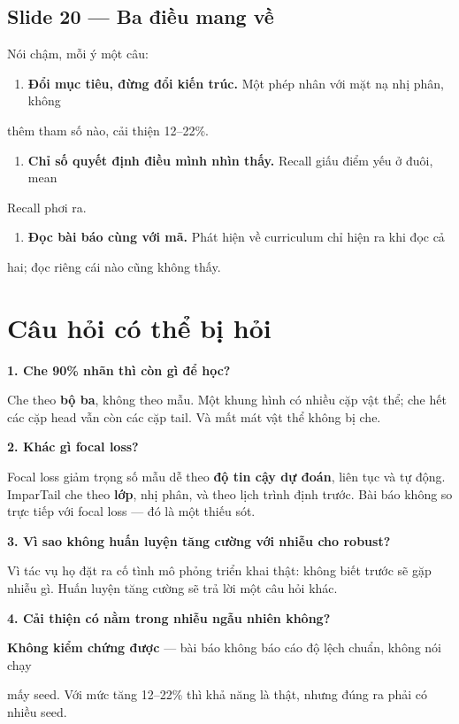 \documentclass[11pt,a4paper]{article}
\begin{document}
\subsection{Slide 20 --- Ba điều mang về}
Nói chậm, mỗi ý một câu:

\begin{enumerate}\itemsep2pt
\item \textbf{Đổi mục tiêu, đừng đổi kiến trúc.} Một phép nhân với mặt nạ nhị phân, không
\end{enumerate}
thêm tham số nào, cải thiện 12--22\%.

\begin{enumerate}\itemsep2pt
\item \textbf{Chỉ số quyết định điều mình nhìn thấy.} Recall giấu điểm yếu ở đuôi, mean
\end{enumerate}
Recall phơi ra.

\begin{enumerate}\itemsep2pt
\item \textbf{Đọc bài báo cùng với mã.} Phát hiện về curriculum chỉ hiện ra khi đọc cả
\end{enumerate}
hai; đọc riêng cái nào cũng không thấy.

\section{Câu hỏi có thể bị hỏi}
\textbf{1. Che 90\% nhãn thì còn gì để học?}

Che theo \textbf{bộ ba}, không theo mẫu. Một khung hình có nhiều cặp vật thể; che hết các cặp head vẫn còn các cặp tail. Và mất mát vật thể không bị che.

\textbf{2. Khác gì focal loss?}

Focal loss giảm trọng số mẫu dễ theo \textbf{độ tin cậy dự đoán}, liên tục và tự động. ImparTail che theo \textbf{lớp}, nhị phân, và theo lịch trình định trước. Bài báo không so trực tiếp với focal loss --- đó là một thiếu sót.

\textbf{3. Vì sao không huấn luyện tăng cường với nhiễu cho robust?}

Vì tác vụ họ đặt ra cố tình mô phỏng triển khai thật: không biết trước sẽ gặp nhiễu gì. Huấn luyện tăng cường sẽ trả lời một câu hỏi khác.

\textbf{4. Cải thiện có nằm trong nhiễu ngẫu nhiên không?}

\textbf{Không kiểm chứng được} --- bài báo không báo cáo độ lệch chuẩn, không nói chạy

mấy seed. Với mức tăng 12--22\% thì khả năng là thật, nhưng đúng ra phải có nhiều seed.
\end{document}
